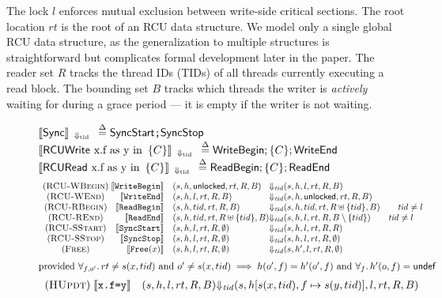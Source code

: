 The lock $l$ enforces mutual exclusion between write-side critical sections.
The root location $rt$ is the root of  an \textsf{RCU} data structure. We model only a single global RCU data structure, as the generalization to multiple structures is straightforward but complicates formal development later in the paper.
The reader set $R$ tracks the thread IDs (TIDs) of all threads currently executing a read block. 
The bounding set $B$ tracks which threads the writer is \emph{actively} waiting for during a grace period --- it is empty if the writer is not waiting.
\begin{figure*}\scriptsize%
  \grammar
   $\llbracket\textsf{Sync}\rrbracket_{\;\;\Downarrow_{\mathrm{tid}}\;\;} \overset{\Delta}{=} \texttt{\textsf{SyncStart};\textsf{SyncStop}}$ \\
  $\llbracket\textsf{RCUWrite} \text{ x.f as y in }\, \{ C \}\rrbracket_{\;\;\Downarrow_{\mathrm{tid}}\;\;} \overset{\Delta}{=} \texttt{\textsf{WriteBegin}} ; \{C\} ;\textsf{WriteEnd}$\\
  $\llbracket\textsf{RCURead} \text{ x.f as y in }\, \{ C \}\rrbracket_{\;\;\Downarrow_{\mathrm{tid}}\;\;} \overset{\Delta}{=} \texttt{\textsf{ReadBegin}}; \{C\} ;\textsf{ReadEnd}$
\[\begin{array}{c@{\;}rl@{\Downarrow_{\mathit{tid}}}ll} 
(\textsc{RCU-WBegin}) & \llbracket\texttt{WriteBegin}\rrbracket & (s,h,\mathsf{unlocked},rt,R,B) &(s,h,l,rt,R,B) & \\
(\textsc{RCU-WEnd}) & \llbracket\texttt{WriteEnd}\rrbracket & (s,h,l,rt,R,B) & (s,h,\mathsf{unlocked},rt,R,B) & \\
(\textsc{RCU-RBegin}) & \llbracket\texttt{ReadBegin}\rrbracket & (s,h,tid,rt,R,B) & (s,h,tid,rt,R\uplus \{tid\},B) \qquad \mathit{tid} \neq l &  \\
(\textsc{RCU-REnd}) & \llbracket\texttt{ReadEnd}\rrbracket & (s,h,tid,rt,R\uplus\{tid\},B) & (s,h,l,rt,R,B\setminus \{tid\}) \qquad  \mathit{tid} \neq l& \\
(\textsc{RCU-SStart}) & \llbracket\texttt{SyncStart}\rrbracket & (s,h,l,rt,R,\emptyset) & (s,h,l,rt,R,R) &\\  %
(\textsc{RCU-SStop}) & \llbracket\texttt{SyncStop}\rrbracket & (s,h,l,rt,R,\emptyset) & (s,h,l,rt,R,\emptyset) &  \\
(\textsc{Free}) & {\llbracket\texttt{Free}(x)\rrbracket} & (s,h,l,rt,R,\emptyset) & (s,h',l,rt,R,\emptyset) &
\end{array}\]
$\textrm{provided}~ \forall_{f,o'}\ldotp rt \neq s(x,tid) \textrm{ and } o' \neq s(x,tid) \implies h(o',f) = h'(o',f) \textrm{ and } \forall_{f}\ldotp h'(o,f)=\textsf{undef}$
\[\begin{array}{c@{\;}rl@{\Downarrow_{\mathit{tid}}}ll} 
(\textsc{HUpdt}) & \llbracket\texttt{x.f=y}\rrbracket   &(s,h,l,rt,R,B)& (s,h[s(x,tid),f \mapsto s(y,tid)],l,rt,R,B) &\\

\end{array}\]
\end{figure*}
